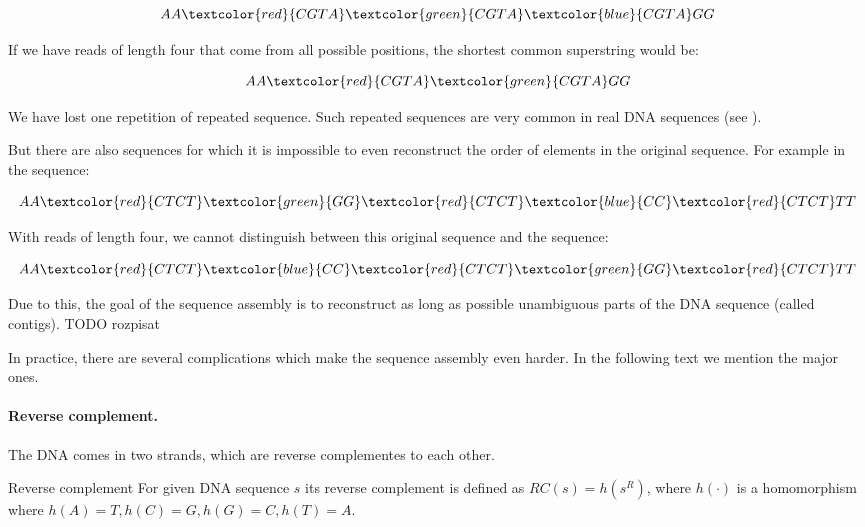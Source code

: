 $$AA\textcolor{red}{CGTA}\textcolor{green}{CGTA}\textcolor{blue}{CGTA}GG$$

If we have reads of length four that come from all possible positions, the shortest
common superstring would be:

$$AA\textcolor{red}{CGTA}\textcolor{green}{CGTA}GG$$

We have lost one repetition of repeated sequence. Such repeated sequences are
very common in real DNA sequences (see \cite{DNARep}).


But there are also sequences for which it is impossible to even 
reconstruct the order of elements
in the original sequence. For example in the sequence:

$$AA\textcolor{red}{CTCT}\textcolor{green}{GG}\textcolor{red}{CTCT}\textcolor{blue}{CC}\textcolor{red}{CTCT}TT$$

With reads of length four, we cannot distinguish between this original sequence and
the sequence:

$$AA\textcolor{red}{CTCT}\textcolor{blue}{CC}\textcolor{red}{CTCT}\textcolor{green}{GG}\textcolor{red}{CTCT}TT$$

Due to this, the goal of the sequence assembly is to reconstruct as long as possible
unambiguous parts of the DNA sequence (called contigs).
TODO rozpisat


In practice, there are several complications which make the sequence assembly even harder.
In the following text we mention the major ones.

\paragraph{Reverse complement.} 
The DNA comes in two strands, which are reverse complementes to each other.

\begin{definition}{Reverse complement}
For given DNA sequence $s$ its reverse complement is defined as
$RC(s) = h(s^R)$, where $h(\cdot)$ is a homomorphism where $h(A) = T, h(C) = G,
h(G) = C, h(T) = A$. 
\end{definition}

